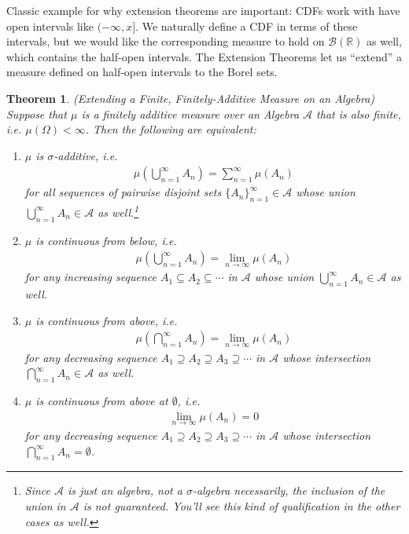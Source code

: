 \documentclass[12pt]{article}
\theoremstyle{plain}
\newtheorem{thm}{Theorem}[section]
\theoremstyle{definition}
\theoremstyle{remark}
\newcommand{\sB}{\mathscr{B}}
\newcommand{\sA}{\mathscr{A}}
\newcommand{\R}{\mathbb{R}}
\newcommand{\sumninf}{\sum^\infty_{n=1}}
\newcommand{\ninf}{_{n=1}^\infty}
\begin{document}
Classic example for why extension theorems are important: CDFs work with
have open intervals like $(-\infty,x]$. We naturally define a CDF in
terms of these intervals, but we would like the corresponding measure to
hold on $\sB(\R)$ as well, which contains the half-open intervals. The
Extension Theorems let us ``extend'' a measure defined on half-open
intervals to the Borel sets.

\begin{thm}
\emph{(Extending a Finite, Finitely-Additive Measure on an Algebra)}
Suppose that $\mu$ is a finitely additive measure over an Algebra $\sA$
that is also finite, i.e. $\mu(\Omega)<\infty$. Then the following are
equivalent:
\begin{enumerate}
  \item $\mu$ is $\sigma$-additive, i.e.
    \begin{align*}
      \mu\left(\bigcup_{n=1}^\infty A_n\right)
      =
      \sumninf \mu\left( A_n\right)
    \end{align*}
    for all sequences of pairwise disjoint sets $\{A_n\}\ninf\in\sA$
    whose union $\bigcup_{n=1}^\infty A_n\in\sA$ as well.\footnote{%
    Since $\sA$ is just an algebra, not a $\sigma$-algebra necessarily,
    the inclusion of the union in $\sA$ is not guaranteed. You'll see
    this kind of qualification in the other cases as well.}

  \item $\mu$ is continuous from below, i.e.
    \begin{align*}
      \mu\left(\bigcup^\infty_{n=1} A_n\right) =
      \lim_{n\rightarrow\infty} \mu(A_n)
    \end{align*}
    for any increasing sequence $A_1\subseteq A_2 \subseteq \cdots$ in
    $\sA$ whose union $\bigcup_{n=1}^\infty A_n\in\sA$ as well.

  \item $\mu$ is continuous from above, i.e.
    \begin{align*}
      \mu\left(\bigcap^\infty_{n=1} A_n\right)
      = \lim_{n\rightarrow\infty} \mu(A_n)
    \end{align*}
    for any decreasing sequence
    $A_1 \supseteq A_2 \supseteq A_3 \supseteq \cdots$ in $\sA$ whose
    intersection $\bigcap_{n=1}^\infty A_n \in \sA$ as well.

  \item $\mu$ is continuous from above at $\emptyset$, i.e.
    \begin{align*}
      \lim_{n\rightarrow\infty} \mu(A_n)
      =0
    \end{align*}
    for any decreasing sequence
    $A_1 \supseteq A_2 \supseteq A_3 \supseteq \cdots$ in $\sA$ whose
    intersection $\bigcap_{n=1}^\infty A_n = \emptyset$.
\end{enumerate}
\end{thm}
\end{document}
